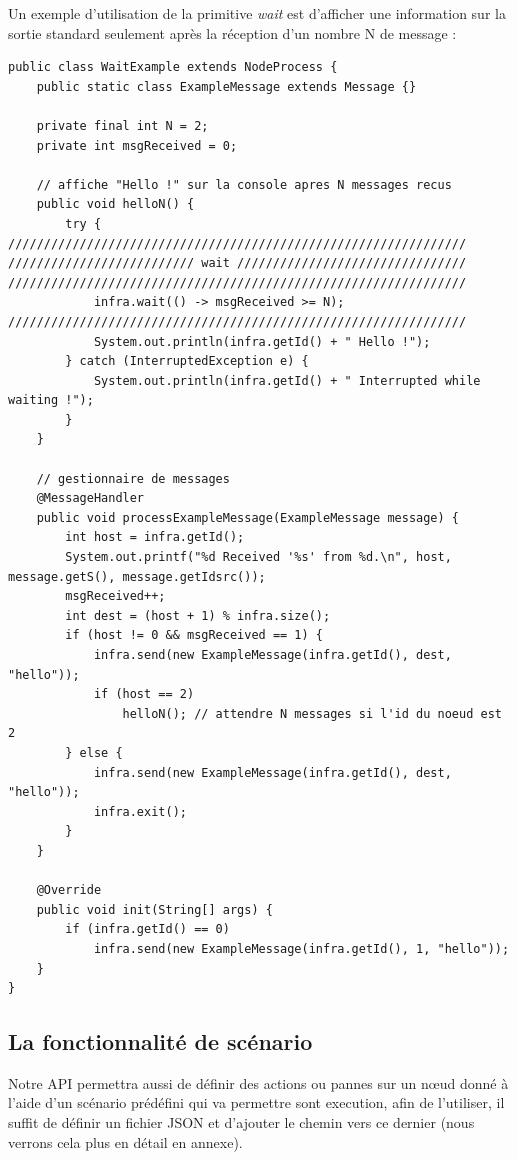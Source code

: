 \documentclass{article}
\begin{document}
					Un exemple d'utilisation de la primitive \emph{wait} est d'afficher une information sur la sortie standard seulement
					après la réception d'un nombre N de message :
					\newpage
					\begin{lstlisting}
public class WaitExample extends NodeProcess {
	public static class ExampleMessage extends Message {}

	private final int N = 2;
	private int msgReceived = 0;

	// affiche "Hello !" sur la console apres N messages recus
	public void helloN() {
		try {
////////////////////////////////////////////////////////////////
////////////////////////// wait ////////////////////////////////
////////////////////////////////////////////////////////////////
			infra.wait(() -> msgReceived >= N);
////////////////////////////////////////////////////////////////
			System.out.println(infra.getId() + " Hello !");
		} catch (InterruptedException e) {
			System.out.println(infra.getId() + " Interrupted while waiting !");
		}
	}

	// gestionnaire de messages
	@MessageHandler
	public void processExampleMessage(ExampleMessage message) {
		int host = infra.getId();
		System.out.printf("%d Received '%s' from %d.\n", host, message.getS(), message.getIdsrc());
		msgReceived++;
		int dest = (host + 1) % infra.size();
		if (host != 0 && msgReceived == 1) {
			infra.send(new ExampleMessage(infra.getId(), dest, "hello"));
			if (host == 2)
				helloN(); // attendre N messages si l'id du noeud est 2
		} else {
			infra.send(new ExampleMessage(infra.getId(), dest, "hello"));
			infra.exit();
		}
	}

	@Override
	public void init(String[] args) {
		if (infra.getId() == 0)
			infra.send(new ExampleMessage(infra.getId(), 1, "hello"));
	}
}
					\end{lstlisting}
					\newpage
					\subsection{La fonctionnalité de scénario}
Notre API permettra aussi de définir des actions ou pannes sur un nœud donné à l'aide d'un scénario prédéfini qui va permettre sont execution,
afin de l'utiliser, il suffit de définir un fichier JSON et d'ajouter le chemin vers ce dernier (nous verrons cela plus en détail en annexe).
\end{document}
